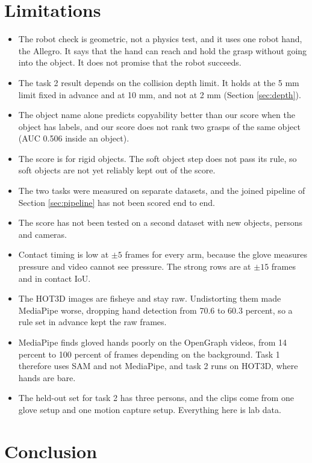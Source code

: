 \documentclass[10pt,twocolumn,letterpaper]{article}
\begin{document}
\section{Limitations}

\begin{itemize}
\item The robot check is geometric, not a physics test, and it uses one robot
hand, the Allegro. It says that the hand can reach and hold the grasp without
going into the object. It does not promise that the robot succeeds.
\item The task 2 result depends on the collision depth limit. It holds at the
5 mm limit fixed in advance and at 10 mm, and not at 2 mm
(Section \ref{sec:depth}).
\item The object name alone predicts copyability better than our score when
the object has labels, and our score does not rank two grasps of the same
object (AUC 0.506 inside an object).
\item The score is for rigid objects. The soft object step does not pass its
rule, so soft objects are not yet reliably kept out of the score.
\item The two tasks were measured on separate datasets, and the joined
pipeline of Section \ref{sec:pipeline} has not been scored end to end.
\item The score has not been tested on a second dataset with new objects,
persons and cameras.
\item Contact timing is low at $\pm 5$ frames for every arm, because the glove
measures pressure and video cannot see pressure. The strong rows are at
$\pm 15$ frames and in contact IoU.
\item The HOT3D images are fisheye and stay raw. Undistorting them made
MediaPipe worse, dropping hand detection from 70.6 to 60.3 percent, so a rule
set in advance kept the raw frames.
\item MediaPipe finds gloved hands poorly on the OpenGraph videos, from 14
percent to 100 percent of frames depending on the background. Task 1 therefore
uses SAM and not MediaPipe, and task 2 runs on HOT3D, where hands are bare.
\item The held-out set for task 2 has three persons, and the clips come from
one glove setup and one motion capture setup. Everything here is lab data.
\end{itemize}

\section{Conclusion}
\end{document}
